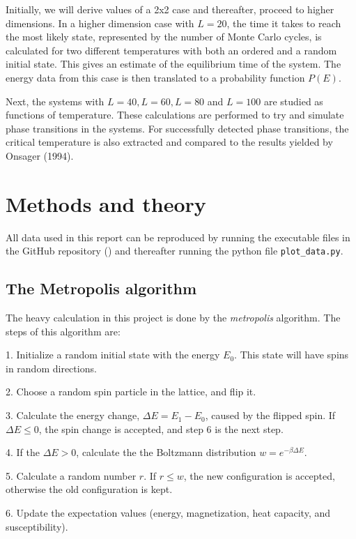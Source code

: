 \documentclass[12pt,english,a4paper]{article}
\begin{document}
Initially, we will derive values of a 2x2 case and thereafter, proceed to higher dimensions. In a higher dimension case with $L=20$, the time it takes to reach the most likely state, represented by the number of Monte Carlo cycles, is calculated for two different temperatures with both an ordered and a random initial state. This gives an estimate of the equilibrium time of the system. The energy data from this case is then translated to a probability function $P(E)$. 

Next, the systems with $L=40, L=60, L=80$ and $L=100$ are studied as functions of temperature. These calculations are performed to try and simulate phase transitions in the systems. For successfully detected phase transitions, the critical temperature is also extracted and compared to the results yielded by Onsager (1994).

\section{Methods and theory} \label{methods_and_theory}

All data used in this report can be reproduced by running the executable files in the GitHub repository (\cite{GitHub}) and thereafter running the python file \texttt{plot\_data.py}.

\subsection{The Metropolis algorithm}

The heavy calculation in this project is done by the \textit{metropolis} algorithm. The steps of this algorithm are:

1. Initialize a random initial state with the energy $E_0$. This state will have spins in random directions. 

2. Choose a random spin particle in the lattice, and flip it.

3. Calculate the energy change, $\Delta E=E_1-E_0$, caused by the flipped spin. If $\Delta E \le 0$, the spin change is accepted, and step 6 is the next step.

4. If the $\Delta E > 0$, calculate the the Boltzmann distribution $w=e^{-\beta \Delta E}$.

5. Calculate a random number $r$. If $r \le w$, the new configuration is accepted, otherwise the old configuration is kept.

6. Update the expectation values (energy, magnetization, heat capacity, and susceptibility).
\end{document}
